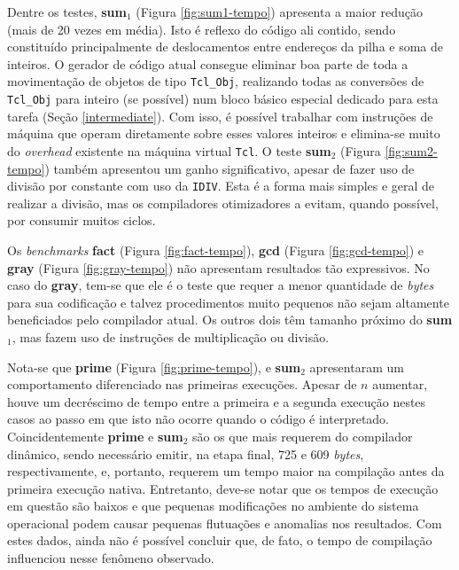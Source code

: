 Dentre os testes, \textbf{sum$_1$} (Figura
\ref{fig:sum1-tempo}) apresenta a maior
redução (mais de 20 vezes em média). Isto é reflexo do código ali
contido, sendo constituído principalmente de deslocamentos entre
endereços da pilha e soma de inteiros. O gerador de código atual
consegue eliminar boa parte de toda a movimentação de objetos de tipo
\verb!Tcl_Obj!, realizando todas as conversões de \verb!Tcl_Obj! para
inteiro (se possível) num bloco básico especial dedicado para esta
tarefa (Seção \ref{intermediate}).
Com isso, é possível trabalhar com instruções de máquina que operam
diretamente sobre esses valores inteiros e elimina-se muito do
\textit{overhead} existente na máquina virtual \texttt{Tcl}. O teste
\textbf{sum$_2$} (Figura \ref{fig:sum2-tempo}) também
apresentou um ganho significativo, apesar de fazer uso de divisão por
constante com uso da \verb!IDIV!. Esta é a forma mais simples e geral de
realizar a divisão, mas os compiladores otimizadores a evitam, quando
possível, \cite{opt-invariantintdiv} por consumir muitos ciclos.

Os \textit{benchmarks} \textbf{fact} (Figura \ref{fig:fact-tempo}),
\textbf{gcd} (Figura \ref{fig:gcd-tempo}) e \textbf{gray} (Figura
\ref{fig:gray-tempo}) não apresentam resultados tão expressivos. No
caso do \textbf{gray}, tem-se que ele é o teste que requer a menor
quantidade de \textit{bytes} para sua codificação e talvez
procedimentos muito pequenos não sejam altamente beneficiados pelo
compilador atual. Os outros dois têm tamanho próximo do
\textbf{sum$_1$}, mas fazem uso de instruções de multiplicação ou
divisão.

Nota-se que \textbf{prime} (Figura \ref{fig:prime-tempo}),
e \textbf{sum$_2$} apresentaram um comportamento
diferenciado nas primeiras execuções. Apesar de $n$ aumentar,
houve um decréscimo de tempo entre a primeira e a segunda
execução nestes casos ao passo em que isto não ocorre quando o código é
interpretado.
Coincidentemente \textbf{prime} e \textbf{sum$_2$} são os que
mais requerem do compilador dinâmico, sendo necessário emitir, na
etapa final, 725 e 609
\textit{bytes}, respectivamente, e, portanto, requerem um tempo maior
na compilação antes da primeira execução nativa. Entretanto, deve-se
notar que os tempos de execução em questão são baixos e que pequenas
modificações no ambiente do sistema operacional podem causar pequenas
flutuações e anomalias nos resultados. Com estes dados, ainda não é
possível concluir que, de fato, o tempo de compilação influenciou
nesse fenômeno observado.


